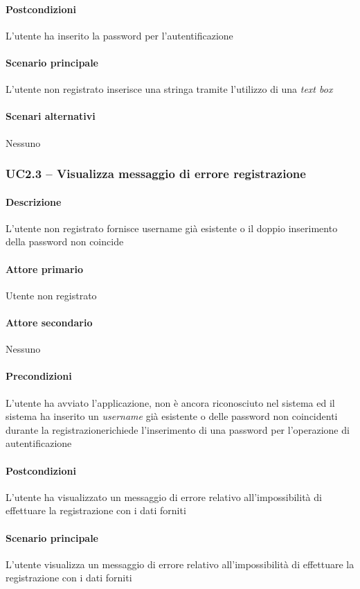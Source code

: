 \paragraph{Postcondizioni}  L’utente ha inserito la password per l’autentificazione
\paragraph{Scenario principale}  
L’utente non registrato inserisce una stringa tramite l’utilizzo di una \textit{text box}
\paragraph{Scenari alternativi}  Nessuno



\subsubsection{UC2.3 – Visualizza messaggio di errore registrazione}
\paragraph{Descrizione}  L’utente non registrato fornisce username già esistente o il doppio inserimento della password non coincide
\paragraph{Attore primario}  Utente non registrato
\paragraph{Attore secondario}  Nessuno
\paragraph{Precondizioni}  L’utente ha avviato l’applicazione, non è ancora riconosciuto nel sistema ed il sistema ha inserito un \textit{username} già esistente o delle password non coincidenti durante la registrazionerichiede l’inserimento di una password per l’operazione di autentificazione
\paragraph{Postcondizioni}  L’utente ha visualizzato un messaggio di errore relativo all’impossibilità di effettuare la registrazione con i dati forniti
\paragraph{Scenario principale}  
L’utente visualizza un messaggio di errore relativo all’impossibilità di effettuare la registrazione con i dati forniti
